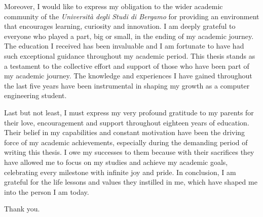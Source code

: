 Moreover, I would like to express my obligation to the wider academic community of the \textit{Università degli Studi di Bergamo} \cite{UnibgWebsite} for providing an environment that encourages learning, curiosity and innovation. 
I am deeply grateful to everyone who played a part, big or small, in the ending of my academic journey. 
The education I received has been invaluable and I am fortunate to have had such exceptional guidance throughout my academic period. 
This thesis stands as a testament to the collective effort and support of those who have been part of my academic journey. 
The knowledge and experiences I have gained throughout the last five years have been instrumental in shaping my growth as a computer engineering student.

Last but not least, I must express my very profound gratitude to my parents for their love, encouragement and support throughout eighteen years of education. 
Their belief in my capabilities and constant motivation have been the driving force of my academic achievements, especially during the demanding period of writing this thesis.
I owe my successes to them because with their sacrifices they have allowed me to focus on my studies and achieve my academic goals, celebrating every milestone with infinite joy and pride.
In conclusion, I am grateful for the life lessons and values they instilled in me, which have shaped me into the person I am today.

Thank you.
